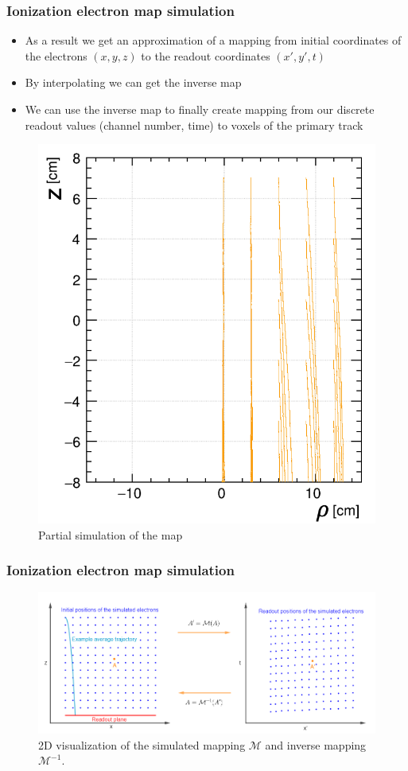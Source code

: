\documentclass{beamer}
\begin{document}
	\begin{frame}
		\frametitle{Ionization electron map simulation}
		\begin{itemize}
			\item As a result we get an approximation of a mapping from initial coordinates of the electrons $(x,y,z)$ to the readout coordinates $(x',y',t)$
			\item By interpolating we can get the inverse map
			\item We can use the inverse map to finally create mapping from our discrete readout values (channel number, time) to voxels of the primary track
		\end{itemize}
		\begin{figure}
			\centering
			\includegraphics[height=0.4\textheight]{../images/map_lines.png}
			\caption{Partial simulation of the map}
		\end{figure}
	\end{frame}
	\begin{frame}
		\frametitle{Ionization electron map simulation}
		\begin{figure}
			\centering
			\includegraphics[width=\textwidth]{../images/map_visualization.png}
			\caption{2D visualization of the simulated mapping $\mathcal{M}$ and inverse mapping $\mathcal{M}^{-1}$.}
		\end{figure}
	\end{frame}
\end{document}
